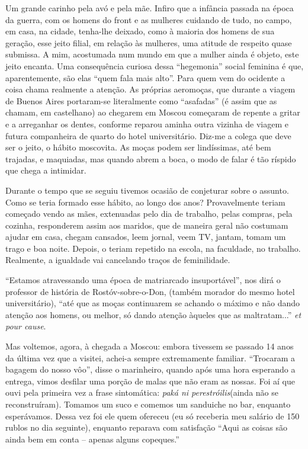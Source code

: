 Um grande carinho pela avó e pela mãe. Infiro que a infância passada na
época da guerra, com os homens do front e as mulheres cuidando de tudo,
no campo, em casa, na cidade, tenha-lhe deixado, como à maioria dos
homens de sua geração, esse jeito filial, em relação às mulheres, uma
atitude de respeito quase submissa. A mim, acostumada num mundo em que a
mulher ainda é objeto, este jeito encanta. Uma consequência curiosa
dessa ``hegemonia'' social feminina é que, aparentemente, são elas
``quem fala mais alto''. Para quem vem do ocidente a coisa chama
realmente a atenção. As próprias aeromoças, que durante a viagem de
Buenos Aires portaram-se literalmente como ``asafadas'' (é assim que as
chamam, em castelhano) ao chegarem em Moscou começaram de repente a
gritar e a arreganhar os dentes, conforme reparou aminha outra vizinha
de viagem e futura companheira de quarto do hotel universitário. Diz-me
a colega que deve ser o jeito, o hábito moscovita. As moças podem ser
lindíssimas, até bem trajadas, e maquiadas, mas quando abrem a boca, o
modo de falar é tão ríspido que chega a intimidar.

Durante o tempo que se seguiu tivemos ocasião de conjeturar sobre o
assunto. Como se teria formado esse hábito, ao longo dos anos?
Provavelmente teriam começado vendo as mães, extenuadas pelo dia de
trabalho, pelas compras, pela cozinha, responderem assim aos maridos,
que de maneira geral não costumam ajudar em casa, chegam cansados, leem
jornal, veem TV, jantam, tomam um trago e boa noite. Depois, o teriam
repetido na escola, na faculdade, no trabalho. Realmente, a igualdade
vai cancelando traços de feminilidade.

``Estamos atravessando uma época de matriarcado insuportável'', nos dirá
o professor de história de Rostóv-sobre-o-Don, (também morador do mesmo
hotel universitário), ``até que as moças continuarem se achando o máximo
e não dando atenção aos homens, ou melhor, só dando atenção àqueles que
as maltratam...'' \emph{et pour cause}.

Mas voltemos, agora, à chegada a Moscou: embora tivessem se passado 14
anos da última vez que a visitei, achei-a sempre extremamente familiar.
``Trocaram a bagagem do nosso vôo'', disse o marinheiro, quando após uma
hora esperando a entrega, vimos desfilar uma porção de malas que não
eram as nossas. Foi aí que ouvi pela primeira vez a frase sintomática:
\emph{paká ni perestróilis}(ainda não se reconstruíram). Tomamos um suco
e comemos um sanduiche no bar, enquanto esperávamos. Dessa vez foi ele
quem ofereceu (eu só receberia meu salário de 150 rublos no dia
seguinte), enquanto reparava com satisfação ``Aqui as coisas são ainda
bem em conta -- apenas alguns copeques.''

